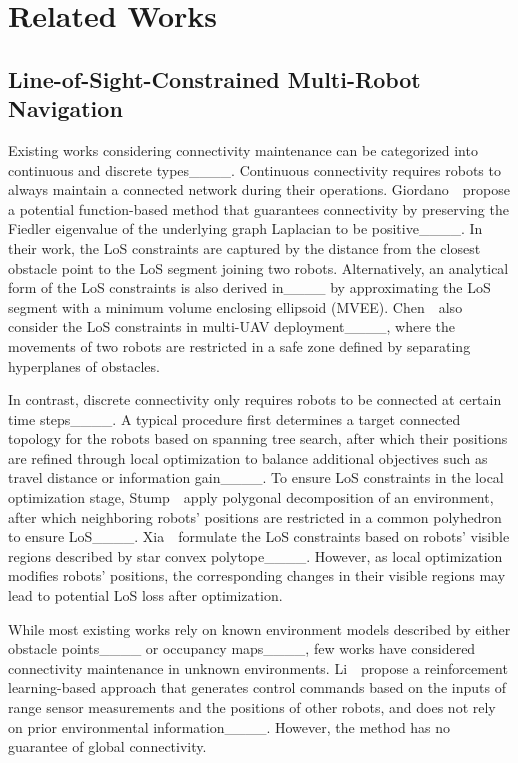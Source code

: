 \section{Related Works}
\subsection{Line-of-Sight-Constrained Multi-Robot Navigation}

Existing works considering connectivity maintenance can be categorized into continuous and discrete types____.
Continuous connectivity requires robots to always maintain a connected network during their operations.
Giordano~\etal~propose a potential function-based method that guarantees connectivity by preserving the Fiedler eigenvalue of the underlying graph Laplacian to be positive____.
In their work, the LoS constraints are captured by the distance from the closest obstacle point to the LoS segment joining two robots.
Alternatively, an analytical form of the LoS constraints is also derived in____ by approximating the LoS segment with a minimum volume enclosing ellipsoid (MVEE).
Chen~\etal~also consider the LoS constraints in multi-UAV deployment____, where the movements of two robots are restricted in a safe zone defined by separating hyperplanes of obstacles.






In contrast, discrete connectivity only requires robots to be connected at certain time steps____.
A typical procedure first determines a target connected topology for the robots based on spanning tree search, after which their positions are refined through local optimization to balance additional objectives such as travel distance or information gain____.
To ensure LoS constraints in the local optimization stage, Stump~\etal~apply polygonal decomposition of an environment, after which neighboring robots' positions are restricted in a common polyhedron to ensure LoS____.
Xia~\etal~formulate the LoS constraints based on robots' visible regions described by star convex polytope____.
However, as local optimization modifies robots' positions, the corresponding changes in their visible regions may lead to potential LoS loss after optimization.

While most existing works rely on known environment models described by either obstacle points____ or occupancy maps____,
few works have considered connectivity maintenance in unknown environments.
Li~\etal~propose a reinforcement learning-based approach that generates control commands based on the inputs of range sensor measurements and the positions of other robots, and does not rely on prior environmental information____.
However, the method has no guarantee of global connectivity.